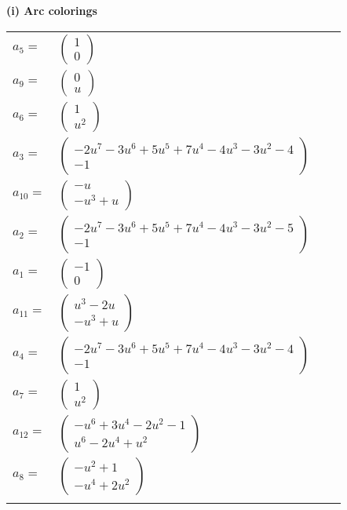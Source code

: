 \documentclass[1p]{elsarticle_modified}
\theoremstyle{definition}
\begin{document}
\flushleft \textbf{(i) Arc colorings}\\
\begin{tabular}{m{7pt} m{180pt} m{7pt} m{180pt} }
\flushright $a_{5}=$&$\begin{pmatrix}1\\0\end{pmatrix}$ \\
\flushright $a_{9}=$&$\begin{pmatrix}0\\u\end{pmatrix}$ \\
\flushright $a_{6}=$&$\begin{pmatrix}1\\u^2\end{pmatrix}$ \\
\flushright $a_{3}=$&$\begin{pmatrix}-2 u^7-3 u^6+5 u^5+7 u^4-4 u^3-3 u^2-4\\-1\end{pmatrix}$ \\
\flushright $a_{10}=$&$\begin{pmatrix}- u\\- u^3+u\end{pmatrix}$ \\
\flushright $a_{2}=$&$\begin{pmatrix}-2 u^7-3 u^6+5 u^5+7 u^4-4 u^3-3 u^2-5\\-1\end{pmatrix}$ \\
\flushright $a_{1}=$&$\begin{pmatrix}-1\\0\end{pmatrix}$ \\
\flushright $a_{11}=$&$\begin{pmatrix}u^3-2 u\\- u^3+u\end{pmatrix}$ \\
\flushright $a_{4}=$&$\begin{pmatrix}-2 u^7-3 u^6+5 u^5+7 u^4-4 u^3-3 u^2-4\\-1\end{pmatrix}$ \\
\flushright $a_{7}=$&$\begin{pmatrix}1\\u^2\end{pmatrix}$ \\
\flushright $a_{12}=$&$\begin{pmatrix}- u^6+3 u^4-2 u^2-1\\u^6-2 u^4+u^2\end{pmatrix}$ \\
\flushright $a_{8}=$&$\begin{pmatrix}- u^2+1\\- u^4+2 u^2\end{pmatrix}$\\&\end{tabular}
\end{document}
